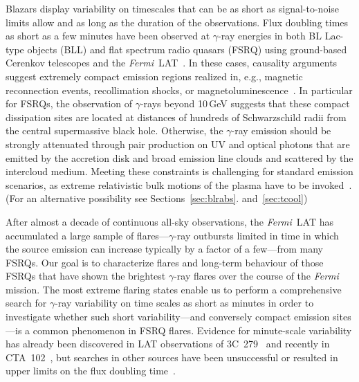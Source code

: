 \documentclass[twocolumn]{aastex62}
\newcommand{\Grays}{$\gamma$-rays\xspace}
\newcommand{\gray}{$\gamma$-ray\xspace}
\newcommand{\Fermi}{\emph{Fermi}\xspace}
\newcommand{\FermiLAT}{\emph{Fermi}~LAT\xspace}
\begin{document}
Blazars display variability on timescales that can be as short as signal-to-noise limits allow and as long as the duration of the observations.
Flux doubling times as short as a few minutes have been observed at \gray energies in both BL Lac-type objects (BLL) and flat spectrum radio quasars (FSRQ) using  ground-based Cerenkov telescopes and the \FermiLAT~\cite[e.g.,][]{2007ApJ...669..862A,pks2155hess2007,pks1222magic2011,2013ApJ...762...92A,2014Sci...346.1080A,TheFermi-LAT:2016dss,2018ApJ...854L..26S}.
In these cases, causality arguments suggest extremely compact emission regions realized in, e.g., magnetic reconnection events, recollimation shocks, or magnetoluminescence~\cite[e.g.][]{Petropoulou:2016xat,Bodo:2017qqn,blandford:2017mag}.
In particular for FSRQs, the observation of \Grays beyond 10\,GeV suggests that these compact dissipation sites are located at distances of hundreds of Schwarzschild  radii from the central supermassive black hole. 
Otherwise, the \gray emission should be strongly attenuated through pair production on UV and optical photons that are emitted by the accretion disk and broad emission line clouds and scattered by the intercloud medium.
Meeting these constraints is challenging for standard emission scenarios, as extreme relativistic bulk motions of the plasma have to be invoked~\cite[e.g.,][]{2010MNRAS.405L..94T,2011A&A...534A..86T,TheFermi-LAT:2016dss}.  (For an alternative possibility see Sections~\ref{sec:blrabs}. and~\ref{sec:tcool})

After almost a decade of continuous all-sky observations, the \FermiLAT has accumulated a large sample of flares---\gray outbursts limited in time in which the source emission can increase typically by a factor of a few---from many FSRQs.
Our goal is to characterize flares and long-term behaviour of those FSRQs that have shown the brightest \gray flares over the course of the \Fermi mission. 
The most extreme flaring states enable us to perform a comprehensive search for \gray variability on time scales as short as minutes in order to investigate whether such short variability---and conversely compact emission sites---is a common phenomenon in FSRQ flares. 
Evidence for minute-scale variability has already been discovered in LAT observations of 3C~279~\citep{TheFermi-LAT:2016dss} and recently in CTA~102~\citep{2018ApJ...854L..26S}, but searches in other sources have been unsuccessful \citep{2017Galax...5..100N} 
or resulted in upper limits on the flux doubling time~\citep{2011A&A...530A..77F}.
\end{document}
